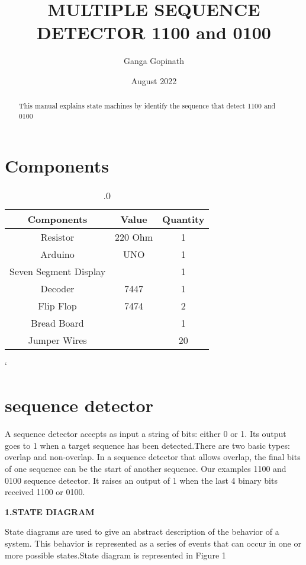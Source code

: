 \documentclass[journal,12pt,twocolumn]{IEEEtran}
\title{ MULTIPLE SEQUENCE DETECTOR 1100 and 0100}
\author{Ganga Gopinath}
\date{August 2022}
\begin{document}
\maketitle
\begin{tableofcontents}
\begin{abstract}
This manual explains state machines by identify the sequence that detect 1100 and 0100
\end{abstract}
\section{Components}

\vspace{0.2cm}

\begin{table}[h]
\centering

\begin{tabular}{|c|c|c|}
\hline
Components & Value & Quantity\\
\hline
Resistor & 220 Ohm & 1\\
\hline
Arduino & UNO & 1\\
\hline
Seven Segment Display & & 1\\
\hline
Decoder & 7447 & 1\\
\hline
Flip Flop & 7474 & 2\\
\hline
Bread Board & & 1\\
\hline
Jumper Wires & & 20\\
\hline
\end{tabular}
\vspace{2mm}
\caption{.0}
\label{table:1}
  `\end{table}
\section{sequence detector}

  A sequence detector accepts as input a string of bits: either 0 or 1. Its output goes to 1 when a target sequence has been detected.There are two basic types:  overlap  and  non-overlap. In a sequence detector that allows overlap, the final bits of one sequence can be  the start of another sequence.  Our examples 1100 and 0100 sequence detector.  It raises an output of 1 when the last 4 binary bits received 1100 or 0100.
  \newline

\textbf{1.STATE DIAGRAM}
\newline

State diagrams are used to give an abstract description of the behavior of a system. This behavior is represented as a series of events that can occur in one or more possible states.State diagram is represented in Figure 1


\end{tableofcontents}
\end{document}
